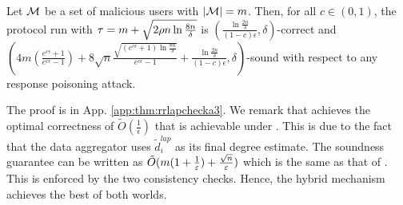 \begin{thm}\label{thm:rrlapchecka3}
	Let $\mathcal{M}$ be a set of malicious users with $|\mathcal{M}| = m$.
    Then, for all $c \in (0,1)$, the \DegHybrid{} protocol run with $\tau = {m + \sqrt{2\rho n \ln \frac{8n}{\delta}}}$ is $(\frac{\ln \frac{2n}{\delta}}{(1-c)\epsilon}, \delta)$-correct and $\left( 4m (\frac{e^{c\epsilon}+1}{e^{c\epsilon}-1}) + 8\sqrt{n}\frac{ \sqrt{(e^{c\epsilon}+1)\ln \frac{8n}{\delta}}}{e^{c\epsilon}-1} + \frac{\ln \frac{2n}{\delta}}{(1-c)\epsilon}, \delta\right)$-sound with respect to any response poisoning attack. \label{thm:response:hybrid}
\end{thm}

The proof is in App. \ref{app:thm:rrlapchecka3}. We remark that \DegHybrid{} achieves the optimal correctness of $\tilde{O}(\frac{1}{\epsilon})$ that is achievable under \ldp. This is due to the fact that the data aggregator uses $\tilde{d}^{lap}_i$ as its final degree estimate. The soundness guarantee can be written as $\tilde{O}(m(1+\frac{1}{\varepsilon}) + \frac{\sqrt{n}}{\varepsilon})$ which is the same as that of \DegRRCheck{}. This is enforced by the two consistency checks.   Hence, the hybrid mechanism achieves the best of both worlds.
